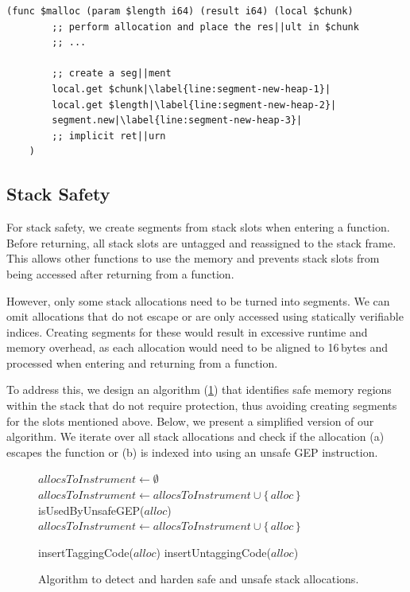 \begin{lstfloat}
    \begin{lstlisting}[frame=h,style=customwasm,
        label={lst:wasm-allocator-example-inner},escapechar=|]
    (func $malloc (param $length i64) (result i64) (local $chunk)
        ;; perform allocation and place the res||ult in $chunk
        ;; ...

        ;; create a seg||ment
        local.get $chunk|\label{line:segment-new-heap-1}|
        local.get $length|\label{line:segment-new-heap-2}|
        segment.new|\label{line:segment-new-heap-3}|
        ;; implicit ret||urn
    )
    \end{lstlisting}
    \caption{Generated \ac{WASM} for code from \cref{lst:heap-allocator-example}.}
    \label{lst:wasm-allocator-example}
\end{lstfloat}

\subsection{Stack Safety}
\label{subsec:stack-safety}

For stack safety, we create segments from stack slots when entering a function.
Before returning, all stack slots are untagged and reassigned to the stack frame.
This allows other functions to use the memory and prevents stack slots from being accessed after returning from a function.

However, only some stack allocations need to be turned into segments.
We can omit allocations that do not escape or are only accessed using statically verifiable indices.
Creating segments for these would result in excessive runtime and memory overhead, as each allocation would need to be aligned to 16\,bytes and processed when entering and returning from a function.

To address this, we design an algorithm (\cref{fig:stack-safety-pseudo}) that identifies safe memory regions within the stack that do not require protection, thus avoiding creating segments for the slots mentioned above.
Below, we present a simplified version of our algorithm.
We iterate over all stack allocations and check if the allocation (a) escapes the function or (b) is indexed into using an unsafe \ac{GEP} instruction.

\begin{figure}
    \begin{algorithmic}
        \State $allocsToInstrument \gets \emptyset$
                \State $allocsToInstrument \gets allocsToInstrument \cup \{\,alloc\,\}$
            \ElsIf
                    {isUsedByUnsafeGEP($alloc$)}
                \State $allocsToInstrument \gets allocsToInstrument \cup \{\,alloc\,\}$
            \EndIf
        \EndFor

            \State insertTaggingCode($alloc$)
            \State insertUntaggingCode($alloc$)
        \EndFor
    \end{algorithmic}
    \caption{Algorithm to detect and harden safe and unsafe stack allocations.}
    \label{fig:stack-safety-pseudo}
\end{figure}

